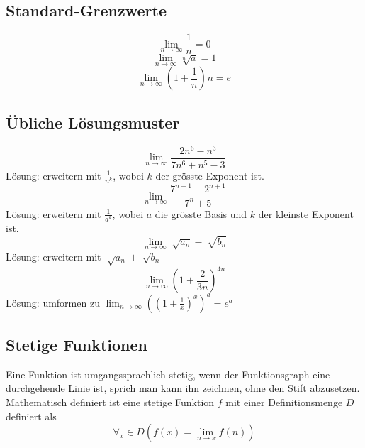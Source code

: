 \documentclass{article}
\begin{document}
\subsection{Standard-Grenzwerte}
$$ \lim_{n \to \infty} \frac{1}{n} = 0$$
$$ \lim_{n \to \infty} \sqrt[n]{a} = 1$$
$$ \lim_{n \to \infty} \left(1+ \frac{1}{n} \right)^{}n = e$$
\subsection{Übliche Lösungsmuster}
$$ \lim_{n \to \infty} \frac{2n^{6}-n^{3}}{7n^{6}+n^{5}-3} $$Lösung: erweitern mit $ \frac{1}{n^{k}}$, wobei $k$ der grösste Exponent ist.
$$ \lim_{n \to \infty} \frac{7^{n-1}+2^{n+1}}{7^{n}+5}$$
Lösung: erweitern mit $ \frac{1}{a^{k}} $, wobei $a$ die grösste Basis und $k$ der kleinste Exponent ist.
$$ \lim_{n \to \infty} \sqrt[]{a_n} - \sqrt[]{b_n}$$ Lösung: erweitern mit $ \sqrt[]{a_n}+ \sqrt[]{b_n}$
$$ \lim_{n \to \infty} \left( 1+ \frac{2}{3n} \right)^{4n}$$
Lösung: umformen zu $ \lim_{n \to \infty} \left(\left(1+ \frac{1}{x}\right)^{x}\right)^{a} = e^{a}$
\subsection{Stetige Funktionen}
Eine Funktion ist umgangssprachlich stetig, wenn der Funktionsgraph eine durchgehende Linie ist, sprich man kann ihn zeichnen, ohne den Stift abzusetzen.
Mathematisch definiert ist eine stetige Funktion $f$ mit einer Definitionsmenge $D$ definiert als
$$\forall_x \in D (f(x) = \lim_{n \to x}f(n))$$
\end{document}
